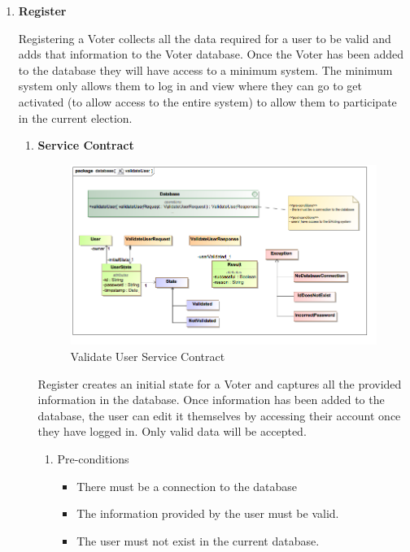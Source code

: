 \begin{enumerate}
	\item \textbf{Register}
	
	Registering a Voter collects all the data required for a user to be valid and adds that information to the Voter database. Once the Voter has been added to the database they will have access to a minimum system. The minimum system only allows them to log in and view where they can go to get activated (to allow access to the entire system) to allow them to participate in the current election.
	
		\begin{enumerate}
			\item \textbf{Service Contract}
				\begin{figure}[H]
					\centering
					\includegraphics[width=0.75\linewidth]{../Images/Database/ServiceContracts/ValidateUser_ServiceContract.png}
					\caption{Validate User Service Contract}
				\end{figure}
				
			Register creates an initial state for a Voter and captures all the provided information in the database. Once information has been added to the database, the user can edit it themselves by accessing their account once they have logged in. Only valid data will be accepted. 
				\newline				
				
				\begin{enumerate}
					\item Pre-conditions
					\begin{itemize}
						\item There must be a connection to the database
						\item The information provided by the user must be valid.
						\item The user must not exist in the current database. 
					\end{itemize}
					

\end{enumerate}
\end{enumerate}
\end{enumerate}
